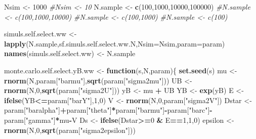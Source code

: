 \documentclass[]{book}
\newenvironment{Shaded}{\begin{snugshade}}{\end{snugshade}}
\newcommand{\KeywordTok}[1]{\textcolor[rgb]{0.13,0.29,0.53}{\textbf{#1}}}
\newcommand{\DataTypeTok}[1]{\textcolor[rgb]{0.13,0.29,0.53}{#1}}
\newcommand{\DecValTok}[1]{\textcolor[rgb]{0.00,0.00,0.81}{#1}}
\newcommand{\StringTok}[1]{\textcolor[rgb]{0.31,0.60,0.02}{#1}}
\newcommand{\CommentTok}[1]{\textcolor[rgb]{0.56,0.35,0.01}{\textit{#1}}}
\newcommand{\ControlFlowTok}[1]{\textcolor[rgb]{0.13,0.29,0.53}{\textbf{#1}}}
\newcommand{\OperatorTok}[1]{\textcolor[rgb]{0.81,0.36,0.00}{\textbf{#1}}}
\newcommand{\NormalTok}[1]{#1}
\theoremstyle{definition}
\theoremstyle{definition}
\theoremstyle{definition}
\theoremstyle{remark}
\begin{document}
\begin{Shaded}
\begin{Highlighting}[]
\NormalTok{Nsim <-}\StringTok{ }\DecValTok{1000}
\CommentTok{#Nsim <- 10}
\NormalTok{N.sample <-}\StringTok{ }\KeywordTok{c}\NormalTok{(}\DecValTok{100}\NormalTok{,}\DecValTok{1000}\NormalTok{,}\DecValTok{10000}\NormalTok{,}\DecValTok{100000}\NormalTok{)}
\CommentTok{#N.sample <- c(100,1000,10000)}
\CommentTok{#N.sample <- c(100,1000)}
\CommentTok{#N.sample <- c(100)}

\NormalTok{simuls.self.select.ww <-}\StringTok{ }\KeywordTok{lapply}\NormalTok{(N.sample,sf.simuls.self.select.ww.N,}\DataTypeTok{Nsim=}\NormalTok{Nsim,}\DataTypeTok{param=}\NormalTok{param)}
\KeywordTok{names}\NormalTok{(simuls.self.select.ww) <-}\StringTok{ }\NormalTok{N.sample}
\end{Highlighting}
\end{Shaded}

\begin{Shaded}
\begin{Highlighting}[]
\NormalTok{monte.carlo.self.select.yB.ww <-}\StringTok{ }\ControlFlowTok{function}\NormalTok{(s,N,param)\{}
  \KeywordTok{set.seed}\NormalTok{(s)}
\NormalTok{  mu <-}\StringTok{ }\KeywordTok{rnorm}\NormalTok{(N,param[}\StringTok{"barmu"}\NormalTok{],}\KeywordTok{sqrt}\NormalTok{(param[}\StringTok{"sigma2mu"}\NormalTok{]))}
\NormalTok{  UB <-}\StringTok{ }\KeywordTok{rnorm}\NormalTok{(N,}\DecValTok{0}\NormalTok{,}\KeywordTok{sqrt}\NormalTok{(param[}\StringTok{"sigma2U"}\NormalTok{]))}
\NormalTok{  yB <-}\StringTok{ }\NormalTok{mu }\OperatorTok{+}\StringTok{ }\NormalTok{UB }
\NormalTok{  YB <-}\StringTok{ }\KeywordTok{exp}\NormalTok{(yB)}
\NormalTok{  E <-}\StringTok{ }\KeywordTok{ifelse}\NormalTok{(YB}\OperatorTok{<=}\NormalTok{param[}\StringTok{"barY"}\NormalTok{],}\DecValTok{1}\NormalTok{,}\DecValTok{0}\NormalTok{)}
\NormalTok{  V <-}\StringTok{ }\KeywordTok{rnorm}\NormalTok{(N,}\DecValTok{0}\NormalTok{,param[}\StringTok{"sigma2V"}\NormalTok{])}
\NormalTok{  Dstar <-}\StringTok{ }\NormalTok{param[}\StringTok{"baralpha"}\NormalTok{]}\OperatorTok{+}\NormalTok{param[}\StringTok{"theta"}\NormalTok{]}\OperatorTok{*}\NormalTok{param[}\StringTok{"barmu"}\NormalTok{]}\OperatorTok{-}\NormalTok{param[}\StringTok{"barc"}\NormalTok{]}\OperatorTok{-}\NormalTok{param[}\StringTok{"gamma"}\NormalTok{]}\OperatorTok{*}\NormalTok{mu}\OperatorTok{-}\NormalTok{V}
\NormalTok{  Ds <-}\StringTok{ }\KeywordTok{ifelse}\NormalTok{(Dstar}\OperatorTok{>=}\DecValTok{0} \OperatorTok{&}\StringTok{ }\NormalTok{E}\OperatorTok{==}\DecValTok{1}\NormalTok{,}\DecValTok{1}\NormalTok{,}\DecValTok{0}\NormalTok{)}
\NormalTok{  epsilon <-}\StringTok{ }\KeywordTok{rnorm}\NormalTok{(N,}\DecValTok{0}\NormalTok{,}\KeywordTok{sqrt}\NormalTok{(param[}\StringTok{"sigma2epsilon"}\NormalTok{]))}

\end{Highlighting}
\end{Shaded}
\end{document}
